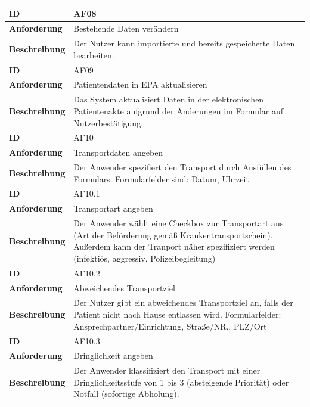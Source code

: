 \documentclass[a4paper, ngerman, 12pt]{scrartcl}
\begin{document}
\begin{tabular}{|l|p{10cm}|}
\hline
\cellcolor{lightgray}\textbf{ID}&AF08\\
\hline
\cellcolor{lightgray}\textbf{Anforderung}&Bestehende Daten verändern\\
\hline
\cellcolor{lightgray}\textbf{Beschreibung}&Der Nutzer kann importierte und bereits gespeicherte Daten bearbeiten.\\
\hline
\hline
\cellcolor{lightgray}\textbf{ID}&AF09\\
\hline
\cellcolor{lightgray}\textbf{Anforderung}&Patientendaten in EPA aktualisieren\\
\hline
\cellcolor{lightgray}\textbf{Beschreibung}&Das System aktualisiert Daten in der elektronischen Patientenakte aufgrund der Änderungen im Formular auf Nutzerbestätigung.\\
\hline
\hline
\cellcolor{lightgray}\textbf{ID}&AF10\\
\hline
\cellcolor{lightgray}\textbf{Anforderung}&Transportdaten angeben\\
\hline
\cellcolor{lightgray}\textbf{Beschreibung}&Der Anwender spezifiert den Transport durch Ausfüllen des Formulars. Formularfelder sind: Datum, Uhrzeit\\
\hline
\hline
\cellcolor{lightgray}\textbf{ID}&AF10.1\\
\hline
\cellcolor{lightgray}\textbf{Anforderung}&Transportart angeben\\
\hline
\cellcolor{lightgray}\textbf{Beschreibung}&Der Anwender wählt eine Checkbox zur Transportart aus (Art der Beförderung gemäß Krankentransportschein). Außerdem kann der Tranport näher spezifiziert werden (infektiös, aggressiv, Polizeibegleitung)\\
\hline
\hline
\cellcolor{lightgray}\textbf{ID}&AF10.2\\
\hline
\cellcolor{lightgray}\textbf{Anforderung}&Abweichendes Transportziel\\
\hline
\cellcolor{lightgray}\textbf{Beschreibung}&Der Nutzer gibt ein abweichendes Transportziel an, falls der Patient nicht nach Hause entlassen wird. Formularfelder: Ansprechpartner/Einrichtung, Straße/NR., PLZ/Ort\\
\hline
\hline
\cellcolor{lightgray}\textbf{ID}&AF10.3\\
\hline
\cellcolor{lightgray}\textbf{Anforderung}&Dringlichkeit angeben\\
\hline
\cellcolor{lightgray}\textbf{Beschreibung}&Der Anwender klassifiziert den Transport mit einer Dringlichkeitsstufe von 1 bis 3 (absteigende Priorität) oder Notfall (sofortige Abholung).\\

\end{tabular}
\end{document}
